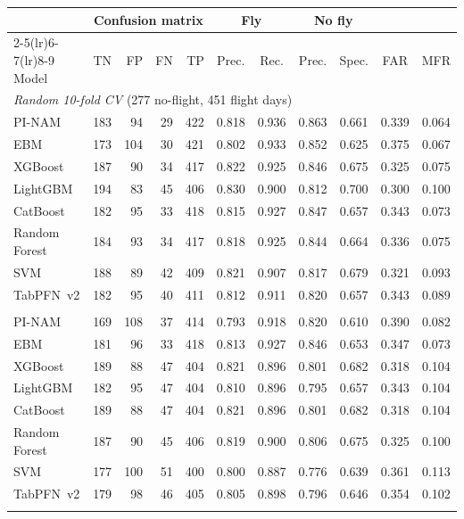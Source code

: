 \begin{tabular}{lrrrrcccccc}
\toprule
 & \multicolumn{4}{c}{Confusion matrix} & \multicolumn{2}{c}{Fly} & \multicolumn{2}{c}{No fly} & & \\
\cmidrule(lr){2-5}\cmidrule(lr){6-7}\cmidrule(lr){8-9}
Model & TN & FP & FN & TP & Prec. & Rec. & Prec. & Spec. & FAR & MFR \\
\midrule
\multicolumn{11}{l}{\textit{Random 10-fold CV} (277 no-flight, 451 flight days)} \\
PI-NAM & 183 & 94 & 29 & 422 & 0.818 & 0.936 & 0.863 & 0.661 & 0.339 & 0.064 \\
EBM & 173 & 104 & 30 & 421 & 0.802 & 0.933 & 0.852 & 0.625 & 0.375 & 0.067 \\
XGBoost & 187 & 90 & 34 & 417 & 0.822 & 0.925 & 0.846 & 0.675 & 0.325 & 0.075 \\
LightGBM & 194 & 83 & 45 & 406 & 0.830 & 0.900 & 0.812 & 0.700 & 0.300 & 0.100 \\
CatBoost & 182 & 95 & 33 & 418 & 0.815 & 0.927 & 0.847 & 0.657 & 0.343 & 0.073 \\
Random Forest & 184 & 93 & 34 & 417 & 0.818 & 0.925 & 0.844 & 0.664 & 0.336 & 0.075 \\
SVM & 188 & 89 & 42 & 409 & 0.821 & 0.907 & 0.817 & 0.679 & 0.321 & 0.093 \\
TabPFN~v2 & 182 & 95 & 40 & 411 & 0.812 & 0.911 & 0.820 & 0.657 & 0.343 & 0.089 \\
\addlinespace
\multicolumn{11}{l}{\textit{Blocked CV} (277 no-flight, 451 flight days)} \\
PI-NAM & 169 & 108 & 37 & 414 & 0.793 & 0.918 & 0.820 & 0.610 & 0.390 & 0.082 \\
EBM & 181 & 96 & 33 & 418 & 0.813 & 0.927 & 0.846 & 0.653 & 0.347 & 0.073 \\
XGBoost & 189 & 88 & 47 & 404 & 0.821 & 0.896 & 0.801 & 0.682 & 0.318 & 0.104 \\
LightGBM & 182 & 95 & 47 & 404 & 0.810 & 0.896 & 0.795 & 0.657 & 0.343 & 0.104 \\
CatBoost & 189 & 88 & 47 & 404 & 0.821 & 0.896 & 0.801 & 0.682 & 0.318 & 0.104 \\
Random Forest & 187 & 90 & 45 & 406 & 0.819 & 0.900 & 0.806 & 0.675 & 0.325 & 0.100 \\
SVM & 177 & 100 & 51 & 400 & 0.800 & 0.887 & 0.776 & 0.639 & 0.361 & 0.113 \\
TabPFN~v2 & 179 & 98 & 46 & 405 & 0.805 & 0.898 & 0.796 & 0.646 & 0.354 & 0.102 \\
\addlinespace

\end{tabular}
